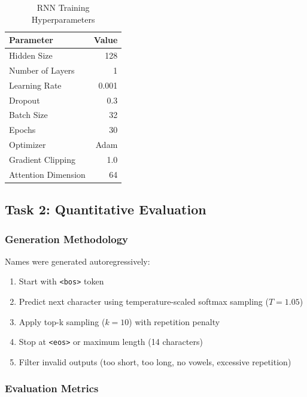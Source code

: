 \documentclass[12pt,a4paper]{article}
\begin{document}
\begin{table}[H]
\centering
\caption{RNN Training Hyperparameters}
\begin{tabular}{@{}lr@{}}
\toprule
\textbf{Parameter} & \textbf{Value} \\
\midrule
Hidden Size & 128 \\
Number of Layers & 1 \\
Learning Rate & 0.001 \\
Dropout & 0.3 \\
Batch Size & 32 \\
Epochs & 30 \\
Optimizer & Adam \\
Gradient Clipping & 1.0 \\
Attention Dimension & 64 \\
\bottomrule
\end{tabular}
\end{table}

\subsection{Task 2: Quantitative Evaluation}

\subsubsection{Generation Methodology}

Names were generated autoregressively:
\begin{enumerate}
    \item Start with \texttt{<bos>} token
    \item Predict next character using temperature-scaled softmax sampling ($T=1.05$)
    \item Apply top-k sampling ($k=10$) with repetition penalty
    \item Stop at \texttt{<eos>} or maximum length (14 characters)
    \item Filter invalid outputs (too short, too long, no vowels, excessive repetition)
\end{enumerate}

\subsubsection{Evaluation Metrics}
\end{document}
